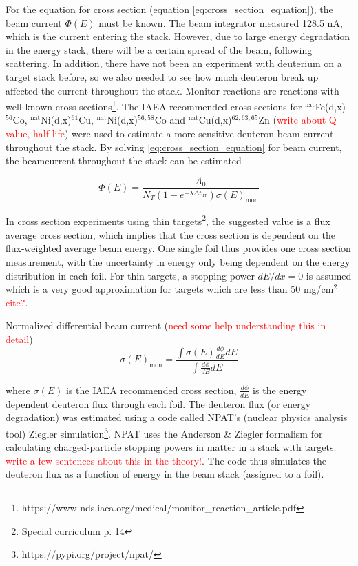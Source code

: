 \documentclass[a4paper,11pt,twoside]{book}
\begin{document}
For the equation for cross section (equation \ref{eq:cross_section_equation}), the beam current $\Phi(E)$ must be known. The beam integrator measured 128.5 nA, which is the current entering the stack. However, due to large energy degradation in the energy stack, there will be a certain spread of the beam, following scattering. In addition, there have not been an experiment with deuterium on a target stack before, so we also needed to see how much deuteron break up affected the current throughout the stack. Monitor reactions are reactions with well-known cross sections\footnote{https://www-nds.iaea.org/medical/monitor_reaction_article.pdf}. The IAEA recommended cross sections for $^\text{nat}$Fe(d,x)$^{56}$Co, $^\text{nat}$Ni(d,x)$^{61}$Cu, $^\text{nat}$Ni(d,x)$^{56,58}$Co and $^\text{nat}$Cu(d,x)$^{62,63,65}$Zn (\textcolor{red}{write about Q value, half life}) were used to estimate a more sensitive deuteron beam current throughout the stack. By solving \ref{eq:cross_section_equation} for beam current, the beamcurrent throughout the stack can be estimated

\begin{equation}
    \Phi(E) = \frac{A_0}{N_T (1-e^{-\lambda \Delta t_\text{irr}})\sigma(E)_\text{mon}}
\end{equation}

In cross section experiments using thin targets\footnote{Special curriculum p. 14}, the suggested value is a flux average cross section, which implies that the cross section is dependent on the flux-weighted average beam energy. One single foil thus provides one cross section measurement, with the uncertainty in energy only being dependent on the energy distribution in each foil. For thin targets, a stopping power $dE/dx=0$ is assumed which is a very good approximation for targets which are less than 50 mg/cm$^2$ \textcolor{red}{cite?}.   

Normalized differential beam current  (\textcolor{red}{need some help understanding this in detail})
\begin{equation}
    \sigma(E)_\text{mon}=\frac{\int \sigma(E)\frac{d\phi}{dE}dE}{\int \frac{d\phi}{dE}dE}
\end{equation}

where $\sigma(E)$ is the IAEA recommended cross section, $\frac{d\phi}{dE}$ is the energy dependent deuteron flux through each foil. The deuteron flux (or energy degradation) was estimated using a code called NPAT's (nuclear physics analysis tool) Ziegler simulation\footnote{https://pypi.org/project/npat/}. NPAT uses the Anderson \& Ziegler formalism for calculating charged-particle stopping powers in matter in a stack with targets. \textcolor{red}{write a few sentences about this in the theory!}. The code thus simulates the deuteron flux as a function of energy in the beam stack (assigned to a foil).
\end{document}
